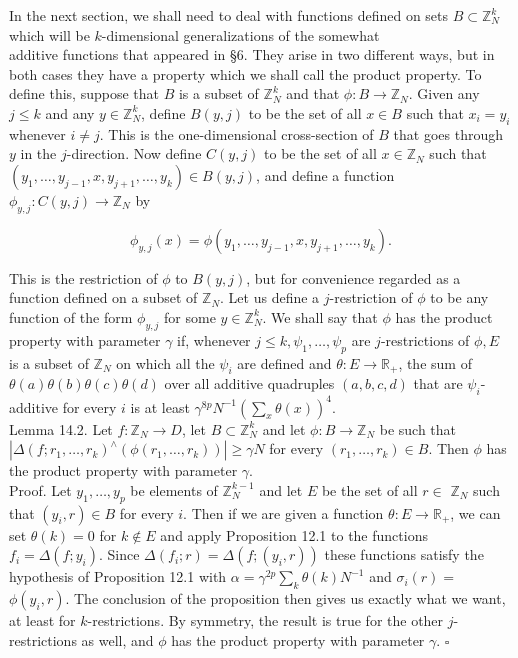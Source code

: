 \documentclass[10pt]{article}
\begin{document}
In the next section, we shall need to deal with functions defined on sets $B \subset \mathbb{Z}_{N}^{k}$ which will be $k$-dimensional generalizations of the somewhat\\
additive functions that appeared in §6. They arise in two different ways, but in both cases they have a property which we shall call the product property. To define this, suppose that $B$ is a subset of $\mathbb{Z}_{N}^{k}$ and that $\phi: B \rightarrow \mathbb{Z}_{N}$. Given any $j \leqslant k$ and any $y \in \mathbb{Z}_{N}^{k}$, define $B(y, j)$ to be the set of all $x \in B$ such that $x_{i}=y_{i}$ whenever $i \neq j$. This is the one-dimensional cross-section of $B$ that goes through $y$ in the $j$-direction. Now define $C(y, j)$ to be the set of all $x \in \mathbb{Z}_{N}$ such that $\left(y_{1}, \ldots, y_{j-1}, x, y_{j+1}, \ldots, y_{k}\right) \in B(y, j)$, and define a function $\phi_{y, j}: C(y, j) \rightarrow \mathbb{Z}_{N}$ by

$$
\phi_{y, j}(x)=\phi\left(y_{1}, \ldots, y_{j-1}, x, y_{j+1}, \ldots, y_{k}\right) .
$$

This is the restriction of $\phi$ to $B(y, j)$, but for convenience regarded as a function defined on a subset of $\mathbb{Z}_{N}$. Let us define a $j$-restriction of $\phi$ to be any function of the form $\phi_{y, j}$ for some $y \in \mathbb{Z}_{N}^{k}$. We shall say that $\phi$ has the product property with parameter $\gamma$ if, whenever $j \leqslant k, \psi_{1}, \ldots, \psi_{p}$ are $j$-restrictions of $\phi, E$ is a subset of $\mathbb{Z}_{N}$ on which all the $\psi_{i}$ are defined and $\theta: E \rightarrow \mathbb{R}_{+}$, the sum of $\theta(a) \theta(b) \theta(c) \theta(d)$ over all additive quadruples $(a, b, c, d)$ that are $\psi_{i}$-additive for every $i$ is at least $\gamma^{8 p} N^{-1}\left(\sum_{x} \theta(x)\right)^{4}$.\\
Lemma 14.2. Let $f: \mathbb{Z}_{N} \rightarrow D$, let $B \subset \mathbb{Z}_{N}^{k}$ and let $\phi: B \rightarrow \mathbb{Z}_{N}$ be such that $\left|\Delta\left(f ; r_{1}, \ldots, r_{k}\right)^{\wedge}\left(\phi\left(r_{1}, \ldots, r_{k}\right)\right)\right| \geqslant \gamma N$ for every $\left(r_{1}, \ldots, r_{k}\right) \in B$. Then $\phi$ has the product property with parameter $\gamma$.\\
Proof. Let $y_{1}, \ldots, y_{p}$ be elements of $\mathbb{Z}_{N}^{k-1}$ and let $E$ be the set of all $r \in$ $\mathbb{Z}_{N}$ such that $\left(y_{i}, r\right) \in B$ for every $i$. Then if we are given a function $\theta: E \rightarrow \mathbb{R}_{+}$, we can set $\theta(k)=0$ for $k \notin E$ and apply Proposition 12.1 to the functions $f_{i}=\Delta\left(f ; y_{i}\right)$. Since $\Delta\left(f_{i} ; r\right)=\Delta\left(f ;\left(y_{i}, r\right)\right)$ these functions satisfy the hypothesis of Proposition 12.1 with $\alpha=\gamma^{2 p} \sum_{k} \theta(k) N^{-1}$ and $\sigma_{i}(r)=$ $\phi\left(y_{i}, r\right)$. The conclusion of the proposition then gives us exactly what we want, at least for $k$-restrictions. By symmetry, the result is true for the other $j$-restrictions as well, and $\phi$ has the product property with parameter $\gamma$. \(\square\)
\end{document}
